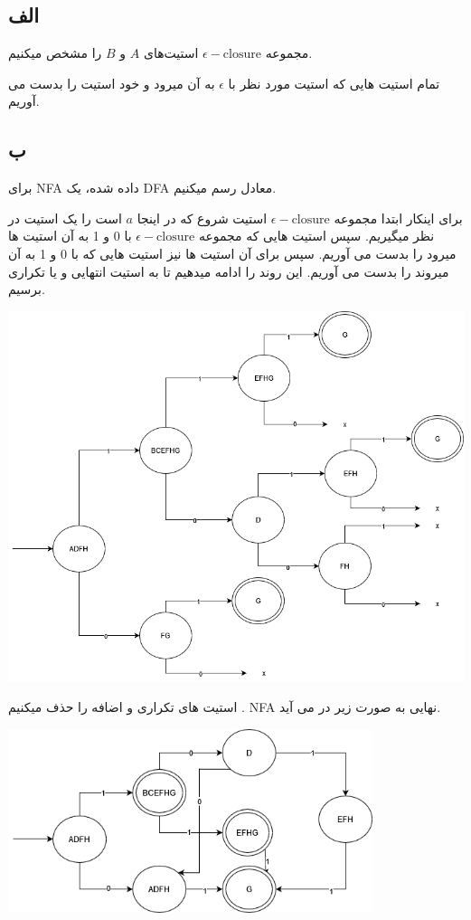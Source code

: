 
\subsection*{الف}
مجموعه
$\epsilon - \text{closure}$
استیت‌های
$A$
و
$B$
را مشخص میکنیم.

 تمام استیت هایی که استیت مورد نظر با 
$\epsilon$
به آن میرود و خود استیت را بدست می آوریم.



\subsection*{ب}
برای
NFA
داده شده، یک
DFA
معادل رسم میکنیم.

برای اینکار ابتدا
مجموعه
$\epsilon - \text{closure}$
استیت شروع که در اینجا
$a$
است را یک استیت در نظر میگیریم. سپس استیت هایی که مجموعه 
$\epsilon - \text{closure}$
با 0 و 1 به آن استیت ها میرود را بدست می آوریم.
سپس برای آن استیت ها نیز استیت هایی که با 0 و 1 به آن میروند را بدست می آوریم. این روند را ادامه میدهیم تا به استیت انتهایی و یا تکراری برسیم.

\begin{center}
    \includegraphics[width = 1\textwidth]{"commons/quiz21.png"}
\end{center}

استیت های تکراری و اضافه را حذف میکنیم
.
NFA 
نهایی به صورت زیر در می آید.
\begin{center}
    \includegraphics[width = 0.8\textwidth]{"commons/quiz22.png"}
\end{center}